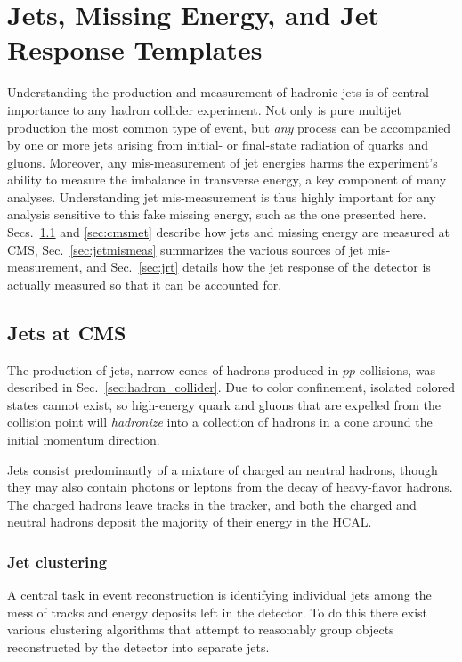 \chapter{Jets, Missing Energy, and Jet Response Templates}

Understanding the production and measurement of hadronic jets is 
of central importance to any hadron collider experiment.
Not only is pure multijet production the most common type of event,
but \textit{any} process can be accompanied by one or more jets
arising from initial- or final-state radiation of quarks and gluons.
Moreover, any mis-measurement of jet energies harms the experiment's 
ability to measure the imbalance in transverse energy, a key component
of many analyses. Understanding jet mis-measurement is thus highly important
for any analysis sensitive to this fake missing energy, such as the
one presented here.
Secs.~\ref{sec:cmsjet} and \ref{sec:cmsmet}
describe how jets and missing energy are measured at CMS, 
Sec.~\ref{sec:jetmismeas} summarizes the various sources of
jet mis-measurement, and Sec.~\ref{sec:jrt} details how
the jet response of the detector is actually measured
so that it can be accounted for.

\section{Jets at CMS}
\label{sec:cmsjet}

The production of jets, narrow cones of hadrons produced
in $pp$ collisions, was described in Sec.~\ref{sec:hadron_collider}.
Due to color confinement, isolated colored states cannot exist,
so high-energy quark and gluons that are expelled from the collision
point will \textit{hadronize} into a collection of hadrons in a 
cone around the initial momentum direction.

Jets consist predominantly of a mixture of charged an neutral 
hadrons, though they may also contain photons or leptons from
the decay of heavy-flavor hadrons. The charged hadrons
leave tracks in the tracker, and both the charged and neutral
hadrons deposit the majority of their energy in the HCAL.

\subsection{Jet clustering}
\label{sec:jetcluster}
A central task in event reconstruction is identifying individual
jets among the mess of tracks and energy deposits left
in the detector. To do this there exist various clustering algorithms
that attempt to reasonably group objects reconstructed by the detector
into separate jets.

